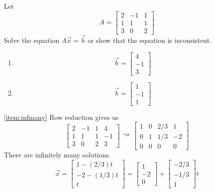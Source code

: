 \documentclass{ximera}
\begin{document}
\begin{example}\label{ex:infinfeasible}
Let $$A=\begin{bmatrix}2&-1&1\\1&1&1\\3&0&2\end{bmatrix}$$  Solve the equation $A\vec{x}=\vec{b}$ or show that the equation is inconsistent.
\begin{enumerate}
    \item \label{item:infmany} $$\vec{b}=\begin{bmatrix}4\\-1\\3\end{bmatrix}$$
    \item \label{item:infeasible}
    $$\vec{b}=\begin{bmatrix}1\\-1\\1\end{bmatrix}$$
\end{enumerate}
\begin{explanation}
 \ref{item:infmany}  Row reduction gives us
 $$\left[\begin{array}{ccc|c}  
 2&-1&1&4\\1&1&1&-1\\3&0&2&3
 \end{array}\right]\begin{array}{c}
 \\
 \rightsquigarrow\\
 \\
 \end{array}\left[\begin{array}{ccc|c}  
 1&0&2/3&1\\0&1&1/3&-2\\0&0&0&0
 \end{array}\right]$$
 There are infinitely many solutions.
 $$\vec{x}=\begin{bmatrix}1-(2/3)t\\-2-(1/3)t\\t\end{bmatrix}=\begin{bmatrix}1\\-2\\0\end{bmatrix}+\begin{bmatrix}-2/3\\-1/3\\1\end{bmatrix}t$$
 

\end{explanation}
\end{example}
\end{document}
